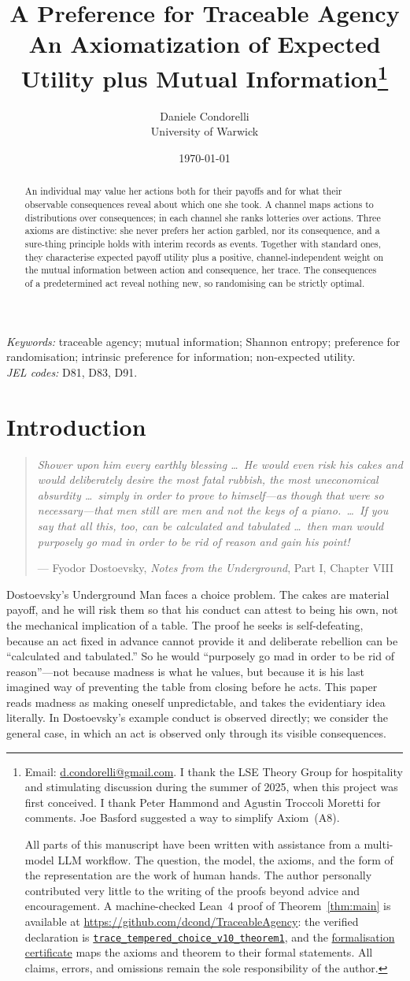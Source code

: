 \documentclass[11pt,a4paper]{article}
\title{A Preference for Traceable Agency\\[0.35em]
\large An Axiomatization of Expected Utility plus Mutual Information\thanks{Email:
\href{mailto:d.condorelli@gmail.com}{d.condorelli@gmail.com}.  I thank the LSE Theory Group for hospitality and stimulating discussion during the summer of 2025, when this project was first conceived. I thank Peter Hammond and Agustin Troccoli Moretti for comments. Joe Basford suggested a way to simplify Axiom~(A8). 

\smallskip
All parts of this manuscript have been written with assistance from a multi-model LLM workflow.  The
question, the model, the axioms, and the form of the representation are the work of human hands.  The author
personally contributed very little to the writing of the proofs beyond advice and encouragement.  A
machine-checked Lean~4 proof of Theorem~\ref{thm:main} is available at
\url{https://github.com/dcond/TraceableAgency}: the verified declaration is
\href{https://github.com/dcond/TraceableAgency/blob/main/TraceableAgency/Theorem1/Proof.lean}{\texttt{trace\_tempered\_choice\_v10\_theorem1}},
and the \href{https://github.com/dcond/TraceableAgency/blob/main/Certificate/FORMALIZATION_CERTIFICATE.md}{formalisation certificate}
maps the axioms and theorem to their formal statements.  All claims, errors, and omissions remain the sole responsibility of the author.}}
\author{Daniele Condorelli\\University of Warwick}
\date{\today}
\theoremstyle{definition}
\newcommand{\1}{\mathbf 1}
\begin{document}
\maketitle

\begin{abstract}
\noindent
An individual may value her actions both for their payoffs and for what their observable consequences reveal
about which one she took.  A channel maps actions to distributions over consequences; in each channel she ranks
lotteries over actions.  Three axioms are distinctive: she never prefers her action garbled, nor its consequence, and
a sure-thing principle holds with interim records as events.  Together with standard ones, they characterise
expected payoff utility plus a positive, channel-independent weight on the mutual information between action and
consequence, her trace.  The consequences of a predetermined act reveal nothing new, so randomising can be
strictly optimal.
\end{abstract}

\medskip
\noindent\textit{Keywords:} traceable agency; mutual information; Shannon entropy; preference for
randomisation; intrinsic preference for information; non-expected utility.\\
\textit{JEL codes:} D81, D83, D91.

\clearpage

\section{Introduction}


\begin{quote}
\emph{Shower upon him every earthly blessing \ldots\ He would even risk his cakes and would deliberately desire the
most fatal rubbish, the most uneconomical absurdity \ldots\ simply in order to prove to himself---as though that were
so necessary---that men still are men and not the keys of a piano.\ \ldots\ If you say that all this, too, can be
calculated and tabulated \ldots\ then man would purposely go mad in order to be rid of reason and gain his point!}

\hfill --- Fyodor Dostoevsky, \emph{Notes from the Underground}, Part I, Chapter VIII \cite{Dostoevsky1864}
\end{quote}


Dostoevsky's Underground Man faces a choice problem.  The cakes are material payoff, and he will risk them so
that his conduct can attest to being his own, not the mechanical implication of a table.  The proof he seeks
is self-defeating, because an act fixed in advance cannot provide it and deliberate rebellion can be
“calculated and tabulated.”  So he would “purposely go mad in order to be rid of reason”---not because
madness is what he values, but because it is his last imagined way of preventing the table from closing before he
acts.  This paper reads madness as making oneself unpredictable, and takes the evidentiary idea literally.  In
Dostoevsky's example conduct is observed directly; we consider the general case, in which an act is observed
only through its visible consequences.
\end{document}

